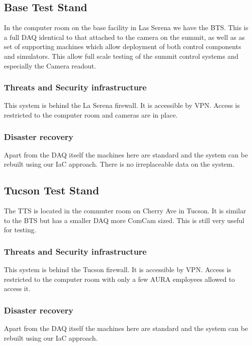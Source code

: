 \subsection{Base Test Stand} \label{sec:bts}
In the computer room on the base facility in Las Serena we have the \gls{BTS}.
This is a full \gls{DAQ} identical to that attached to the camera on the summit, as well as as set of supporting machines which allow deployment of both control components and simulators.
This allow full scale testing of the summit control systems and especially the Camera readout.
\subsubsection{Threats and Security infrastructure}
This system is behind the La Serena firewall. It is accessible by VPN.
Access is restricted to the computer room and cameras are in place.

\subsubsection{Disaster recovery}
Apart from the DAQ itself the machines here are standard and the system can be rebuilt using our \gls{IaC} approach.
There is no irreplaceable data on the system.

\subsection{Tucson Test Stand} \label{sec:tts}
The \gls{TTS} is located in the commuter room on Cherry Ave in Tucson.
It is similar to the \gls{BTS}  but has a smaller DAQ more ComCam sized.
This is still very useful for testing.
\subsubsection{Threats and Security infrastructure}
This system is behind the Tucson firewall. It is accessible by VPN.
Access is restricted to the computer room with only a few AURA employees allowed to access it.

\subsubsection{Disaster recovery}
Apart from the DAQ itself the machines here are standard and the system can be rebuilt using our \gls{IaC} approach.

